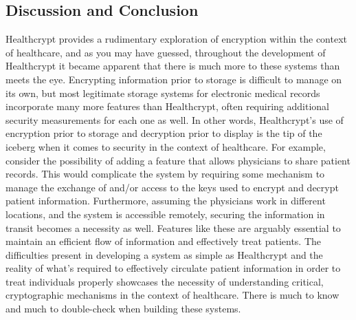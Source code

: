 \documentclass[letterpaper, 10pt,DIV=13]{scrartcl}
\begin{document}
\begin{multicols}{2}
\section*{Discussion and Conclusion}
\begin{spacing}{1.25}
Healthcrypt provides a rudimentary exploration of encryption within the context of healthcare, and as you may have guessed, throughout the development of Healthcrypt it became apparent that there is much more to these systems than meets the eye. Encrypting information prior to storage is difficult to manage on its own, but most legitimate storage systems for electronic medical records incorporate many more features than Healthcrypt, often requiring additional security measurements for each one as well. In other words, Healthcrypt's use of encryption prior to storage and decryption prior to display is the tip of the iceberg when it comes to security in the context of healthcare. For example, consider the possibility of adding a feature that allows physicians to share patient records. This would complicate the system by requiring some mechanism to manage the exchange of and/or access to the keys used to encrypt and decrypt patient information. Furthermore, assuming the physicians work in different locations, and the system is accessible remotely, securing the information in transit becomes a necessity as well. Features like these are arguably essential to maintain an efficient flow of information and effectively treat patients. The difficulties present in developing a system as simple as Healthcrypt and the reality of what's required to effectively circulate patient information in order to treat individuals properly showcases the necessity of understanding critical, cryptographic mechanisms in the context of healthcare. There is much to know and much to double-check when building these systems.
\end{spacing}

\vspace{-2.5pt}




\end{multicols}
\end{document}
